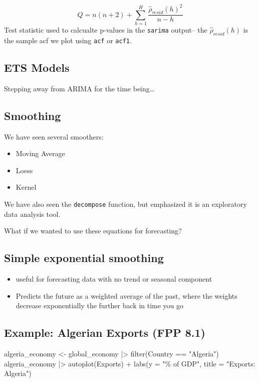 \documentclass[
  letterpaper,
  DIV=11,
  numbers=noendperiod]{scrartcl}
\newenvironment{Shaded}{\begin{snugshade}}{\end{snugshade}}
\newcommand{\AttributeTok}[1]{\textcolor[rgb]{0.40,0.45,0.13}{#1}}
\newcommand{\FunctionTok}[1]{\textcolor[rgb]{0.28,0.35,0.67}{#1}}
\newcommand{\NormalTok}[1]{\textcolor[rgb]{0.00,0.23,0.31}{#1}}
\newcommand{\OtherTok}[1]{\textcolor[rgb]{0.00,0.23,0.31}{#1}}
\newcommand{\SpecialCharTok}[1]{\textcolor[rgb]{0.37,0.37,0.37}{#1}}
\newcommand{\StringTok}[1]{\textcolor[rgb]{0.13,0.47,0.30}{#1}}
\providecommand{\tightlist}{%
  \setlength{\itemsep}{0pt}\setlength{\parskip}{0pt}}\usepackage{longtable,booktabs,array}
\begin{document}
\[
Q = n(n+2) + \sum_{h=1}^H \frac{\hat{\rho}_{resid}(h)^2}{n-h}
\] Test statistic used to calcualte p-values in the \texttt{sarima}
output-- the \(\hat{\rho}_{resid}(h)\) is the sample acf we plot using
\texttt{acf} or \texttt{acf1}.

\subsection{ETS Models}\label{ets-models}

Stepping away from ARIMA for the time being\ldots{}

\subsection{Smoothing}\label{smoothing}

We have seen several smoothers:

\begin{itemize}
\tightlist
\item
  Moving Average
\item
  Loess
\item
  Kernel
\end{itemize}

We have also seen the \texttt{decompose} function, but emphasized it is
an exploratory data analysis tool.

What if we wanted to use these equations for forecasting?

\subsection{Simple exponential
smoothing}\label{simple-exponential-smoothing}

\begin{itemize}
\item
  useful for forecasting data with no trend or seasonal component
\item
  Predicts the future as a weighted average of the past, where the
  weights decrease exponentially the further back in time you go
\end{itemize}

\subsection{Example: Algerian Exports (FPP
8.1)}\label{example-algerian-exports-fpp-8.1}

\begin{Shaded}
\begin{Highlighting}[]
\NormalTok{algeria\_economy }\OtherTok{\textless{}{-}}\NormalTok{ global\_economy }\SpecialCharTok{|\textgreater{}}
  \FunctionTok{filter}\NormalTok{(Country }\SpecialCharTok{==} \StringTok{"Algeria"}\NormalTok{)}
\NormalTok{algeria\_economy }\SpecialCharTok{|\textgreater{}}
  \FunctionTok{autoplot}\NormalTok{(Exports) }\SpecialCharTok{+}
  \FunctionTok{labs}\NormalTok{(}\AttributeTok{y =} \StringTok{"\% of GDP"}\NormalTok{, }\AttributeTok{title =} \StringTok{"Exports: Algeria"}\NormalTok{)}
\end{Highlighting}
\end{Shaded}
\end{document}
